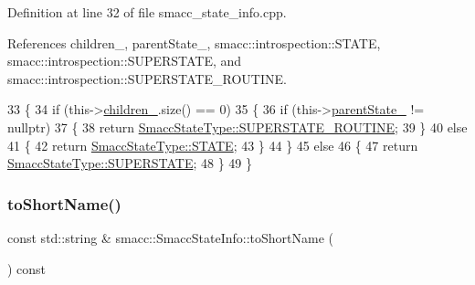 Definition at line 32 of file smacc\+\_\+state\+\_\+info.\+cpp.



References children\+\_\+, parent\+State\+\_\+, smacc\+::introspection\+::\+S\+T\+A\+TE, smacc\+::introspection\+::\+S\+U\+P\+E\+R\+S\+T\+A\+TE, and smacc\+::introspection\+::\+S\+U\+P\+E\+R\+S\+T\+A\+T\+E\+\_\+\+R\+O\+U\+T\+I\+NE.


\begin{DoxyCode}
33 \{
34     \textcolor{keywordflow}{if} (this->\hyperlink{classsmacc_1_1introspection_1_1SmaccStateInfo_a73eac049e8149b6eaeec735101c32ef9}{children\_}.size() == 0)
35     \{
36         \textcolor{keywordflow}{if} (this->\hyperlink{classsmacc_1_1introspection_1_1SmaccStateInfo_afa49a141d2ccdb3d6f9676ed380ce006}{parentState\_} != \textcolor{keyword}{nullptr})
37         \{
38             \textcolor{keywordflow}{return} \hyperlink{namespacesmacc_1_1introspection_a710cf406873961567c11027582c7f720a6d39c20504d2f2afe9c8c27351e61d20}{SmaccStateType::SUPERSTATE\_ROUTINE};
39         \}
40         \textcolor{keywordflow}{else}
41         \{
42             \textcolor{keywordflow}{return} \hyperlink{namespacesmacc_1_1introspection_a710cf406873961567c11027582c7f720a2b848a8cc886d253d21a77c43cd50aae}{SmaccStateType::STATE};
43         \}
44     \}
45     \textcolor{keywordflow}{else}
46     \{
47         \textcolor{keywordflow}{return} \hyperlink{namespacesmacc_1_1introspection_a710cf406873961567c11027582c7f720a4da54a31b31f1c863864fdee05fc35c8}{SmaccStateType::SUPERSTATE};
48     \}
49 \}
\end{DoxyCode}
\mbox{\label{classsmacc_1_1introspection_1_1SmaccStateInfo_a39d7f8a587087b6abd0752058e2d8301}} 
\subsubsection{\texorpdfstring{to\+Short\+Name()}{toShortName()}}
{\footnotesize\ttfamily const std\+::string \& smacc\+::\+Smacc\+State\+Info\+::to\+Short\+Name (\begin{DoxyParamCaption}{ }\end{DoxyParamCaption}) const}



